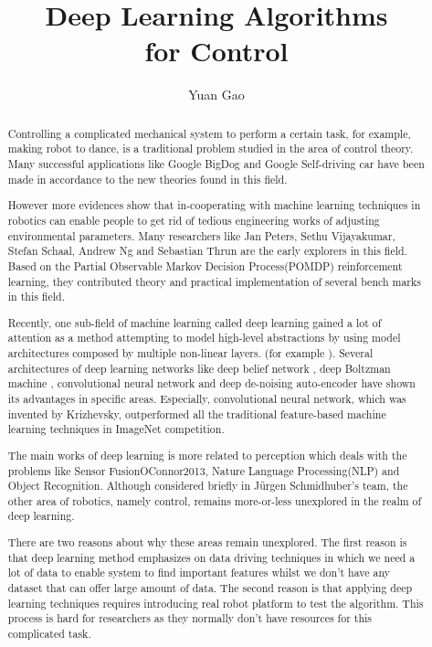 \documentclass[officiallayout]{tktla}
\title{Deep Learning Algorithms \\ for Control}
\author{Yuan Gao}
\begin{document}
\frontmatter
\maketitle
\begin{abstract}
Controlling a complicated mechanical system to perform a certain task, for example, making robot to dance, is a traditional problem studied in the area of control theory. Many successful applications like Google BigDog\cite{Raibert2008} and Google Self-driving car  have been made in accordance to the new theories found in this field.

However more evidences show that in-cooperating with machine learning techniques in robotics can enable people to get rid of tedious engineering works of adjusting environmental parameters. Many researchers like Jan Peters, Sethu Vijayakumar, Stefan Schaal, Andrew Ng and Sebastian Thrun are the early explorers in this field. Based on the Partial Observable Markov Decision Process(POMDP) reinforcement learning, they contributed theory and practical implementation of several bench marks in this field.

Recently, one sub-field of machine learning called deep learning gained a lot of attention as a method attempting to model high-level abstractions by using model architectures composed by multiple non-linear layers. (for example \cite{Krizhevsky2012}). Several architectures of deep learning networks like deep belief network \cite{Hinton2006}, deep Boltzman machine \cite{Salakhutdinov2009}, convolutional neural network \cite{Krizhevsky2012} and deep de-noising auto-encoder \cite{Vincent2010} have shown its advantages in specific areas. Especially, convolutional neural network, which was invented by Krizhevsky, outperformed all the traditional feature-based machine learning techniques in ImageNet competition.

The main works of deep learning is more related to perception which deals with the problems like Sensor Fusion{OConnor2013}, Nature Language Processing(NLP)\cite{Cho2014} and Object Recognition\cite{Lenz2013}\cite{Hoffman2014}. Although considered briefly in J{\"u}rgen Schmidhuber's team\cite{Mayer2006}, the other area of robotics, namely control, remains more-or-less unexplored in the realm of deep learning.

There are two reasons about why these areas remain unexplored. The first reason is that deep learning method emphasizes on data driving techniques in which we need a lot of data to enable system to find important features whilst we don't have any dataset that can offer large amount of data. The second reason is that applying deep learning techniques requires introducing real robot platform to test the algorithm. This process is hard for researchers as they normally don't have resources for this complicated task.


\end{abstract}
\end{document}
